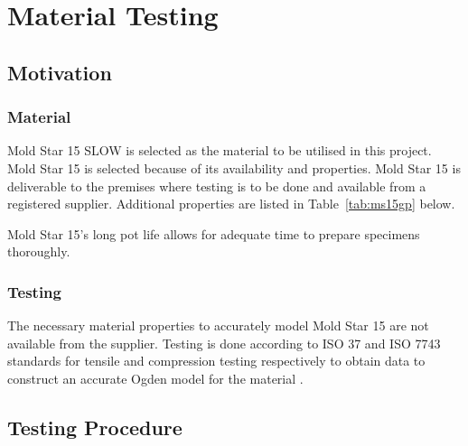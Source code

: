 \chapter{Material Testing}
\label{chp:MT}

\section{Motivation}

\subsection{Material}

Mold Star 15 SLOW is selected as the material to be utilised in this project. Mold Star 15 is selected because of its availability and properties. Mold Star 15 is deliverable to the premises where testing is to be done and available from a registered supplier. Additional properties are listed in Table~\ref{tab:ms15gp} below.

\begin{table}[H]
	\centering
	\caption{Mold Star 15 Given Properties \cite{MoldStar}}
	\label{tab:ms15gp}
\end{table}

Mold Star 15's long pot life allows for adequate time to prepare specimens thoroughly. 

\subsection{Testing}

The necessary material properties to accurately model Mold Star 15 are not available from the supplier. Testing is done according to ISO 37 and ISO 7743 standards for tensile and compression testing respectively to obtain data to construct an accurate Ogden model for the material \cite{ISO37,ISO7743}.

\section{Testing Procedure}


